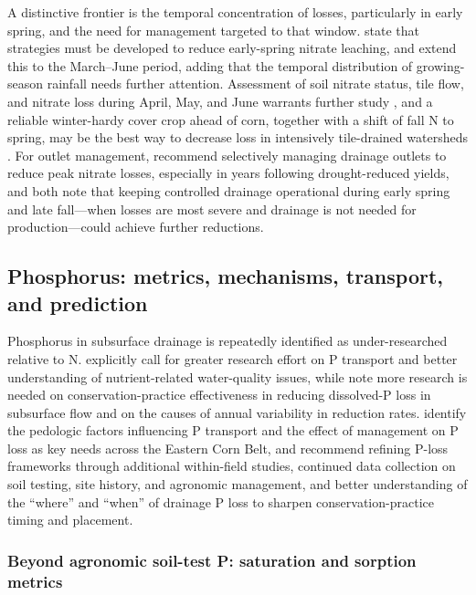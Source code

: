 A distinctive frontier is the temporal concentration of losses, particularly in early spring, and the need for management targeted to that window. \textcite{Bakhsh2007} state that strategies must be developed to reduce early-spring nitrate leaching, and \textcite{Bakhsh2010} extend this to the March--June period, adding that the temporal distribution of growing-season rainfall needs further attention. Assessment of soil nitrate status, tile flow, and nitrate loss during April, May, and June warrants further study \parencite{Nance2007}, and a reliable winter-hardy cover crop ahead of corn, together with a shift of fall N to spring, may be the best way to decrease loss in intensively tile-drained watersheds \parencite{Gentry2024}. For outlet management, \textcite{Skaggs1995} recommend selectively managing drainage outlets to reduce peak nitrate losses, especially in years following drought-reduced yields, and both \textcite{Elmi2004,Elmi2002} note that keeping controlled drainage operational during early spring and late fall---when losses are most severe and drainage is not needed for production---could achieve further reductions.

\subsection{Phosphorus: metrics, mechanisms, transport, and prediction}

Phosphorus in subsurface drainage is repeatedly identified as under-researched relative to N. \textcite{Hertzberger2019} explicitly call for greater research effort on P transport and better understanding of nutrient-related water-quality issues, while \textcite{Yuan2022} note more research is needed on conservation-practice effectiveness in reducing dissolved-P loss in subsurface flow and on the causes of annual variability in reduction rates. \textcite{Pease2018} identify the pedologic factors influencing P transport and the effect of management on P loss as key needs across the Eastern Corn Belt, and \textcite{deOliveira2022} recommend refining P-loss frameworks through additional within-field studies, continued data collection on soil testing, site history, and agronomic management, and better understanding of the ``where'' and ``when'' of drainage P loss to sharpen conservation-practice timing and placement.

\subsubsection{Beyond agronomic soil-test P: saturation and sorption metrics}

